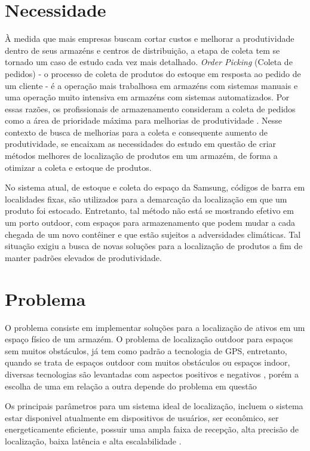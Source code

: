 \section{Necessidade}
\textual
À medida que mais empresas buscam cortar custos e melhorar a produtividade dentro de seus armazéns e centros de distribuição, a etapa de coleta tem se tornado um caso de estudo cada vez mais detalhado. \textit{Order Picking} (Coleta de pedidos) - o processo de coleta de produtos do estoque em resposta ao pedido de um cliente - é a operação mais trabalhosa em armazéns com sistemas manuais e uma operação muito intensiva em armazéns com sistemas automatizados. Por essas razões, os profissionais de armazenamento consideram a coleta de pedidos como a área de prioridade máxima para melhorias de produtividade \cite{art3}.
Nesse contexto de busca de melhorias para a coleta e consequente aumento de produtividade, se encaixam as necessidades do estudo em questão de criar métodos melhores de localização de produtos em um armazém, de forma a otimizar a coleta e estoque de produtos.

No sistema atual, de estoque e coleta do espaço da Samsung, códigos de barra em localidades fixas, são utilizados para a demarcação da localização em que um produto foi estocado. Entretanto, tal método não está se mostrando efetivo em um porto outdoor, com espaços para armazenamento que podem mudar a cada chegada de um novo contêiner e que estão sujeitos a adversidades climáticas. Tal situação exigiu a busca de novas soluções para a localização de produtos a fim de manter padrões elevados de produtividade.


\section{Problema}
\textual
O problema consiste em implementar soluções para a localização de ativos em um espaço físico de um armazém.
O problema de localização outdoor para espaços sem muitos obstáculos, já tem como padrão a tecnologia de GPS, entretanto, quando se trata de espaços outdoor com muitos obstáculos ou espaços indoor, diversas tecnologias são levantadas com aspectos positivos e negativos \cite{art4}, porém a escolha de uma em relação a outra depende do problema em questão

Os principais parâmetros para um sistema ideal de localização, incluem o sistema estar disponivel atualmente em dispositivos de usuários, ser econômico, ser energeticamente eficiente, possuir uma ampla faixa de recepção, alta precisão de localização, baixa latência e alta escalabilidade \cite{art2}.

